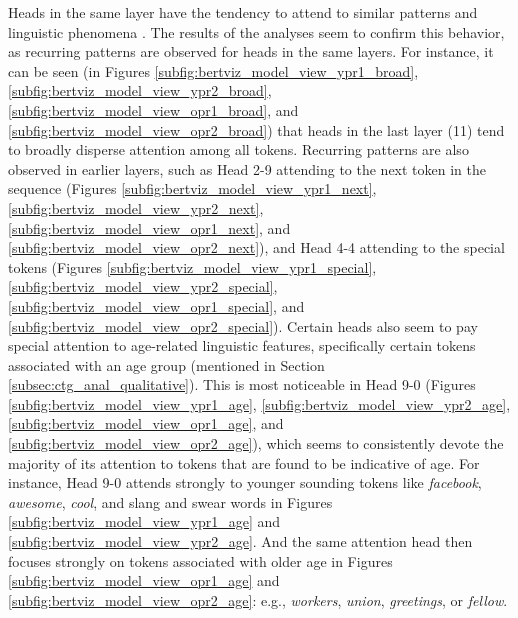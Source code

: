 Heads in the same layer have the tendency to attend to similar patterns and linguistic phenomena \cite{clark-etal-2019-bert}. The results of the analyses seem to confirm this behavior, as recurring patterns are observed for heads in the same layers. For instance, it can be seen (in Figures \ref{subfig:bertviz_model_view_ypr1_broad}, \ref{subfig:bertviz_model_view_ypr2_broad}, \ref{subfig:bertviz_model_view_opr1_broad}, and \ref{subfig:bertviz_model_view_opr2_broad}) that heads in the last layer (11) tend to broadly disperse attention among all tokens. Recurring patterns are also observed in earlier layers, such as Head 2-9 attending to the next token in the sequence (Figures \ref{subfig:bertviz_model_view_ypr1_next}, \ref{subfig:bertviz_model_view_ypr2_next}, \ref{subfig:bertviz_model_view_opr1_next}, and \ref{subfig:bertviz_model_view_opr2_next}), and Head 4-4 attending to the special tokens (Figures \ref{subfig:bertviz_model_view_ypr1_special}, \ref{subfig:bertviz_model_view_ypr2_special}, \ref{subfig:bertviz_model_view_opr1_special}, and \ref{subfig:bertviz_model_view_opr2_special}). Certain heads also seem to pay special attention to age-related linguistic features, specifically certain tokens associated with an age group (mentioned in Section \ref{subsec:ctg_anal_qualitative}). This is most noticeable in Head 9-0 (Figures \ref{subfig:bertviz_model_view_ypr1_age}, \ref{subfig:bertviz_model_view_ypr2_age}, \ref{subfig:bertviz_model_view_opr1_age}, and \ref{subfig:bertviz_model_view_opr2_age}), which seems to consistently devote the majority of its attention to tokens that are found to be indicative of age. For instance, Head 9-0 attends strongly to younger sounding tokens like \textit{facebook}, \textit{awesome}, \textit{cool}, and slang and swear words in Figures \ref{subfig:bertviz_model_view_ypr1_age} and \ref{subfig:bertviz_model_view_ypr2_age}. And the same attention head then focuses strongly on tokens associated with older age in Figures \ref{subfig:bertviz_model_view_opr1_age} and \ref{subfig:bertviz_model_view_opr2_age}: e.g., \textit{workers}, \textit{union}, \textit{greetings}, or \textit{fellow}.




